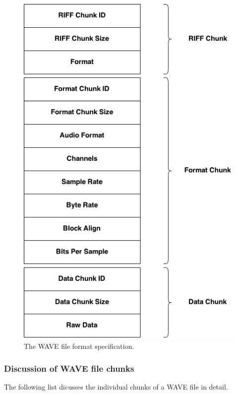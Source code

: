 \begin{figure}[p!]
  \includegraphics[scale=0.7]{img/wave}
  \caption{The WAVE file format specification.}
  \label{fig:wave}
\end{figure}

\pagebreak

\subsubsection{Discussion of WAVE file chunks}

The following list dicusses the individual chunks of a WAVE file in detail.

